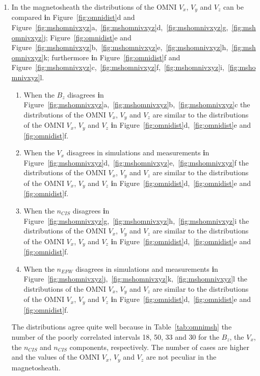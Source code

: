\documentclass[linenumbers,draft]{agujournal}
\begin{document}
\begin{enumerate}
\item In the magnetosheath the distributions of the OMNI $V_{x}$, $V_{y}$ and $V_{z}$ can be compared \textbf{i}n Figure~\ref{fig:omnidist}d and Figure~\ref{fig:mshomnivxyz}a,~\ref{fig:mshomnivxyz}d,~\ref{fig:mshomnivxyz}g,~\ref{fig:mshomnivxyz}j; Figure~\ref{fig:omnidist}e and Figure~\ref{fig:mshomnivxyz}b,~\ref{fig:mshomnivxyz}e,~\ref{fig:mshomnivxyz}h,~\ref{fig:mshomnivxyz}k; furthermore \textbf{i}n Figure~\ref{fig:omnidist}f and Figure~\ref{fig:mshomnivxyz}c,~\ref{fig:mshomnivxyz}f,~\ref{fig:mshomnivxyz}i,~\ref{fig:mshomnivxyz}l.
\begin{enumerate}
\item When the $B_{z}$ disagrees \textbf{i}n Figure~\ref{fig:mshomnivxyz}a,~\ref{fig:mshomnivxyz}b,~\ref{fig:mshomnivxyz}c the distributions of the OMNI $V_{x}$, $V_{y}$ and $V_{z}$ are similar to the distributions of the OMNI $V_{x}$, $V_{y}$ and $V_{z}$ \textbf{i}n Figure~\ref{fig:omnidist}d,~\ref{fig:omnidist}e and \ref{fig:omnidist}f.

\item When the $V_{x}$ disagrees in simulations and measurements \textbf{i}n Figure~\ref{fig:mshomnivxyz}d,~\ref{fig:mshomnivxyz}e,~\ref{fig:mshomnivxyz}f the distributions of the OMNI $V_{x}$, $V_{y}$ and $V_{z}$ are similar to the distributions of the OMNI $V_{x}$, $V_{y}$ and $V_{z}$ \textbf{i}n Figure~\ref{fig:omnidist}d,~\ref{fig:omnidist}e and \ref{fig:omnidist}f.

\item When the $n_{CIS}$ disagrees \textbf{i}n Figure~\ref{fig:mshomnivxyz}g,~\ref{fig:mshomnivxyz}h,~\ref{fig:mshomnivxyz}i the distributions of the OMNI $V_{x}$, $V_{y}$ and $V_{z}$ are similar to the distributions of the OMNI $V_{x}$, $V_{y}$ and $V_{z}$ \textbf{i}n Figure~\ref{fig:omnidist}d,~\ref{fig:omnidist}e and \ref{fig:omnidist}f.

\item When the $n_{EFW}$ disagrees in simulations and measurements \textbf{i}n Figure~\ref{fig:mshomnivxyz}j,~\ref{fig:mshomnivxyz}k,~\ref{fig:mshomnivxyz}l the distributions of the OMNI $V_{x}$, $V_{y}$ and $V_{z}$ are similar to the distributions of the OMNI $V_{x}$, $V_{y}$ and $V_{z}$ \textbf{i}n Figure~\ref{fig:omnidist}d,~\ref{fig:omnidist}e and \ref{fig:omnidist}f.
\end{enumerate}
The distributions agree quite well because in Table~\ref{tab:omnimsh} the number of the poorly correlated intervals 18, 50, 33 and 30 for the $B_{z}$, the $V_{x}$, the $n_{CIS}$ and $n_{CIS}$ components, respectively. The number of cases are higher and the values of the OMNI $V_{x}$, $V_{y}$ and $V_{z}$ are not peculiar in the magnetosheath.


\end{enumerate}
\end{document}
